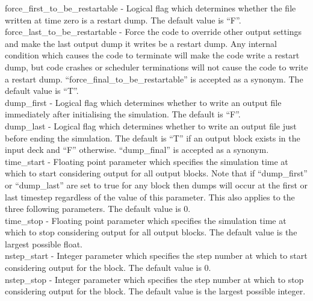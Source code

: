 {\emphtext force\_first\_to\_be\_restartable} - Logical flag which determines
  whether the file written at time zero is a restart dump. The default value
  is ``F''.\\

{\emphtext force\_last\_to\_be\_restartable} - Force the code to override
other output settings and make the last output dump it writes be a restart
dump. Any internal condition which causes the code to terminate will make the
code write a restart dump, but code crashes or scheduler terminations will not
cause the code to write a restart dump.
``force\_final\_to\_be\_restartable'' is accepted as a synonym.
The default value is ``T''.\\

{\emphtext dump\_first} - Logical flag which determines whether to write an
  output file immediately after initialising the simulation. The default is
  ``F''.\\

{\emphtext dump\_last} - Logical flag which determines whether to write an
  output file just before ending the simulation. The default is ``T'' if
  an output block exists in the input deck and ``F'' otherwise.
  ``dump\_final'' is accepted as a synonym.\\

{\emphtext time\_start} - Floating point parameter which specifies the
  simulation time at which to start considering output for all output
  blocks. Note
  that if ``dump\_first'' or ``dump\_last'' are set to true for any block then
  dumps will occur at the first or last timestep regardless of the value of this
  parameter. This also applies to the three following parameters.
  The default value is 0.\\

{\emphtext time\_stop} - Floating point parameter which specifies the
  simulation time at which to stop considering output for all output blocks.
  The default value is the largest possible float.\\

{\emphtext nstep\_start} - Integer parameter which specifies the
  step number at which to start considering output for the block.
  The default value is 0.\\

{\emphtext nstep\_stop} - Integer parameter which specifies the
  step number at which to stop considering output for the block.
  The default value is the largest possible integer.\\

